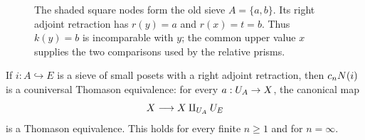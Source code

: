 \begin{figure}[htbp]
\centering
{}
\caption{The shaded square nodes form the old sieve $A=\{a,b\}$.
Its right adjoint retraction has $r(y)=a$ and $r(x)=t=b$.
Thus $k(y)=b$ is incomparable with $y$; the common upper value $x$
supplies the two comparisons used by the relative prisms.}
\label{fig:local-diamond}
\end{figure}

\begin{theorem}[Couniversality]\label{thm:couniversal}
If $i:A\hookrightarrow E$ is a sieve of small posets with a right
adjoint retraction, then $c_nN(i)$ is a couniversal Thomason
equivalence: for every $a:U_{A}\to X$, the canonical map
\[
 X\longrightarrow X\amalg_{U_{A}}U_{E}
\]
is a Thomason equivalence.  This holds for every finite $n\ge1$ and
for $n=\infty$.
\end{theorem}

